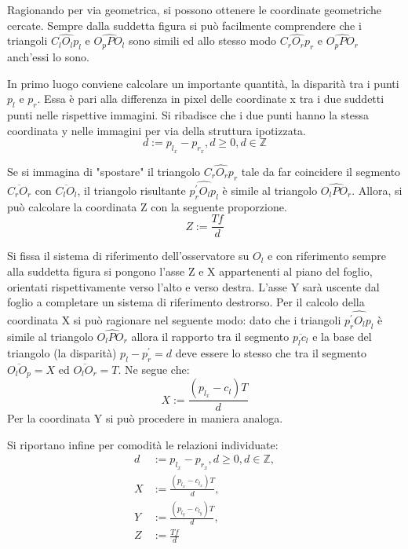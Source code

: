 Ragionando per via geometrica, si possono ottenere le coordinate geometriche cercate. Sempre dalla suddetta figura si può facilmente comprendere che i triangoli  $\widehat{C_lO_lp_l}$ e $\widehat{O_pPO_l}$ sono simili ed allo stesso modo $\widehat{C_rO_rp_r}$ e $\widehat{O_pPO_r}$ anch'essi lo sono. 

In primo luogo conviene calcolare un importante quantità, la disparità tra i punti $p_l$ e $p_r$. Essa è pari alla differenza in pixel delle coordinate x  tra i due suddetti punti nelle rispettive immagini. Si ribadisce che i due punti hanno la stessa coordinata y nelle immagini per via della struttura ipotizzata.
\begin{equation}
	d := p_{l_x} - p_{r_x}, d \ge 0, d \in \mathbb{Z}
\end{equation}

Se si immagina di "spostare" il triangolo $\widehat{C_rO_rp_r}$ tale da far coincidere il segmento $\overline{C_rO_r}$ con $\overline{C_lO_l}$, il triangolo risultante $\widehat{p_r^{'}O_lp_l}$ è simile al triangolo $\widehat{O_lPO_r}$. Allora, si può calcolare la coordinata Z con la seguente proporzione.
\begin{equation}
Z := \frac{Tf}{d}
\end{equation}

Si fissa il sistema di riferimento dell'osservatore su $O_l$ e con riferimento sempre alla suddetta figura si pongono l'asse Z e X appartenenti al piano del foglio, orientati rispettivamente verso l'alto e verso destra. L'asse Y sarà uscente dal foglio a completare un sistema di riferimento destrorso. 
Per il calcolo della coordinata X si può ragionare nel seguente modo: dato che i triangoli $\widehat{p_r^{'}O_lp_l}$ è simile al triangolo $\widehat{O_lPO_r}$ allora il rapporto tra il segmento $\overline{p_lc_l}$ e la base del triangolo (la disparità) $p_l - p_r^{'} = d$ deve essere lo stesso che tra il segmento $\overline{O_lO_p} = X$ ed $\overline{O_lO_r} = T$. Ne segue che:
\begin{equation}
	X := \frac{(p_{l_x} - c_l) T}{d}
\end{equation}
Per la coordinata Y si può procedere in maniera analoga.

Si riportano infine per comodità le relazioni individuate:
\begin{align}
	d &:= p_{l_x} - p_{r_x}, d \ge 0, d \in \mathbb{Z},\\
	X &:= \frac{(p_{l_x} - c_{l_x}) T}{d},\\
	Y &:= \frac{(p_{l_y} - c_{l_y}) T}{d},\\
	Z &:= \frac{Tf}{d}
\end{align}

